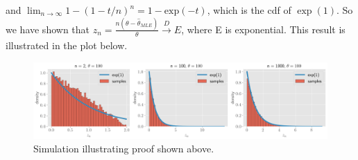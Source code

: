 \documentclass[11pt]{article}
\begin{document}
and $\lim_{n\to\infty}  1 -  (1-t/n)^n = 1-\text{exp}(-t)$, which is the cdf of $\exp(1)$. So we have shown that $ z_n = \frac{n(\theta-\hat{\theta}_{MLE})}{\theta} \xrightarrow[]{D} E$, where E is exponential. This result is illustrated in the plot below.

\begin{figure}[!h]
    \centering
    \includegraphics[scale=.4]{homework_2/figures/uniform.png}
    \caption{Simulation illustrating proof shown above.}
    \label{fig:my_label}
\end{figure}
\end{document}
